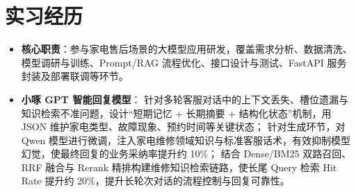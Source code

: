 \documentclass[10pt]{article}
\begin{document}

    \section[实习经历]{\makebox[\iconwidth][c]{\color{primarycolor}{\faBriefcase}}\quad 实习经历}

    \begin{itemize}
        \item \textbf{核心职责}：参与家电售后场景的大模型应用研发，覆盖需求分析、数据清洗、模型调研与训练、Prompt/RAG 流程优化、接口设计与测试、FastAPI 服务封装及部署联调等环节。
        \item \textbf{小啄 GPT 智能回复模型}：
        针对多轮客服对话中的上下文丢失、槽位遗漏与知识检索不准问题，设计“短期记忆 + 长期摘要 + 结构化状态”机制，用 JSON 维护家电类型、故障现象、预约时间等关键状态；
        针对生成环节，对 Qwen 模型进行微调，注入家电维修领域知识与标准客服话术，有效抑制模型幻觉，使最终回复的业务采纳率提升约 10\%；
        结合 Dense/BM25 双路召回、RRF 融合与 Rerank 精排构建维修知识检索链路，使长尾 Query 检索 Hit Rate 提升约 20\%，提升长轮次对话的流程控制与回复可靠性。
    \end{itemize}


\end{document}
